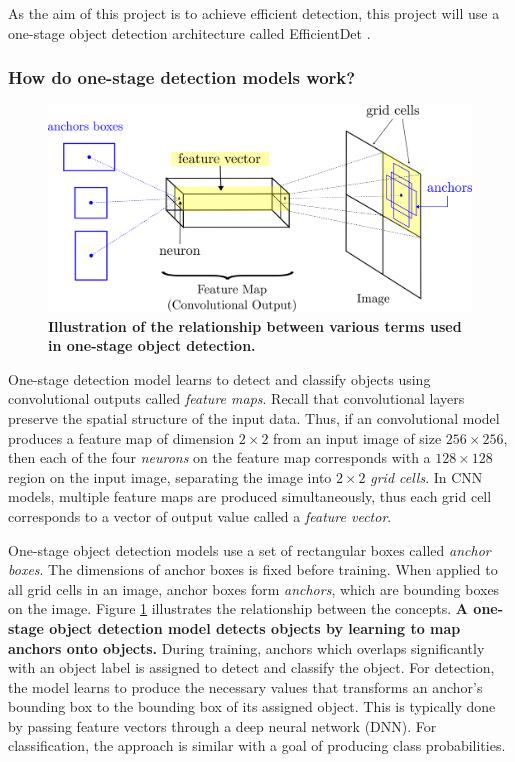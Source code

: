 \documentclass[12pt,a4paper,twoside,openany]{report}
\begin{document}
As the aim of this project is to achieve efficient detection, this project will use a one-stage object detection architecture called EfficientDet \cite{tan_efficientdet_2020}.

\subsubsection{How do one-stage detection models work?} \label{section:one_stage}
\begin{figure}[H]
    \centering
    \includegraphics{figs/prep/anchor_box.png}
    \caption{\textbf{Illustration of the relationship between various terms used in one-stage object detection.}}
    \label{fig:explain_anchors}
\end{figure}

One-stage detection model learns to detect and classify objects using convolutional outputs called \textit{feature maps}. Recall that convolutional layers preserve the spatial structure of the input data. Thus, if an convolutional model produces a feature map of dimension $2 \times 2$ from an input image of size $256 \times 256$, then each of the four \textit{neurons} on the feature map corresponds with a $128 \times 128$ region on the input image, separating the image into $2 \times 2$ \textit{grid cells}.
In CNN models, multiple feature maps are produced simultaneously, thus each grid cell corresponds to a vector of output value called a \textit{feature vector}.

One-stage object detection models use a set of rectangular boxes called \textit{anchor boxes}. The dimensions of anchor boxes is fixed before training. When applied to all grid cells in an image, anchor boxes form \textit{anchors}, which are bounding boxes on the image. Figure \ref{fig:explain_anchors} illustrates the relationship between  the concepts. \textbf{A one-stage object detection model detects objects by learning to map anchors onto objects.} During training, anchors which overlaps significantly with an object label is assigned to detect and classify the object. For detection, the model learns to produce the necessary values that transforms an anchor's bounding box to the bounding box of its assigned object. This is typically done by passing feature vectors through a deep neural network (DNN). For classification, the approach is similar with a goal of producing class probabilities.
\end{document}
